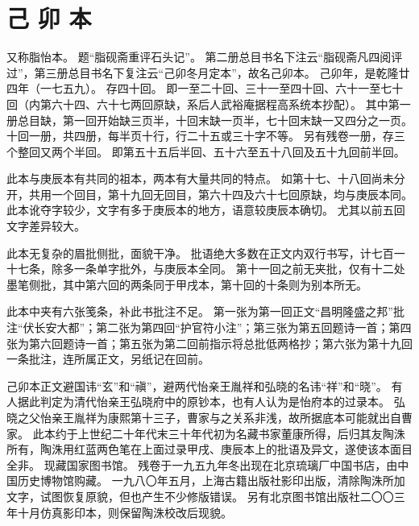 \section*{己 卯 本}
又称脂怡本。
题“脂砚斋重评石头记”。
第二册总目书名下注云“脂砚斋凡四阅评过”，第三册总目书名下复注云“己卯冬月定本”，故名己卯本。
己卯年，是乾隆廿四年（一七五九）。
存四十回。
即一至二十回、三十一至四十回、六十一至七十回（内第六十四、六十七两回原缺，系后人武裕庵据程高系统本抄配）。
其中第一册总目缺，第一回开始缺三页半，十回末缺一页半，七十回末缺一又四分之一页。
十回一册，共四册，每半页十行，行二十五或三十字不等。
另有残卷一册，存三个整回又两个半回。
即第五十五后半回、五十六至五十八回及五十九回前半回。
\par
此本与庚辰本有共同的祖本，两本有大量共同的特点。
如第十七、十八回尚未分开，共用一个回目，第十九回无回目，第六十四及六十七回原缺，均与庚辰本同。
此本讹夺字较少，文字有多于庚辰本的地方，语意较庚辰本确切。
尤其以前五回文字差异较大。
\par
此本无复杂的眉批侧批，面貌干净。
批语绝大多数在正文内双行书写，计七百一十七条，除多一条单字批外，与庚辰本全同。
第十一回之前无夹批，仅有十二处墨笔侧批，其中第六回的两条同于甲戌本，第十回的十条则为别本所无。
\par
此本中夹有六张笺条，补此书批注不足。
第一张为第一回正文“昌明隆盛之邦”批注“伏长安大都”；第二张为第四回“护官符小注”；第三张为第五回题诗一首；第四张为第六回题诗一首；第五张为第二回前指示将总批低两格抄；第六张为第十九回一条批注，连所属正文，另纸记在回前。
\par
己卯本正文避国讳“玄”和“禛”，避两代怡亲王胤祥和弘晓的名讳“祥”和“晓”。
有人据此判定为清代怡亲王弘晓府中的原钞本，也有人认为是怡府本的过录本。
弘晓之父怡亲王胤祥为康熙第十三子，曹家与之关系非浅，故所据底本可能就出自曹家。
此本约于上世纪二十年代末三十年代初为名藏书家董康所得，后归其友陶洙所有，陶洙用红蓝两色笔在上面过录甲戌、庚辰本上的批语及异文，遂使该本面目全非。
现藏国家图书馆。
残卷于一九五九年冬出现在北京琉璃厂中国书店，由中国历史博物馆购藏。
一九八〇年五月，上海古籍出版社影印出版，清除陶洙所加文字，试图恢复原貌，但也产生不少修版错误。
另有北京图书馆出版社二〇〇三年十月仿真影印本，则保留陶洙校改后现貌。
\par
